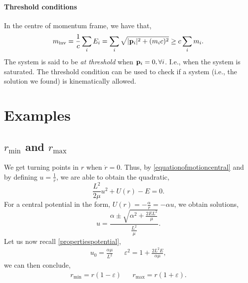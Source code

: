 \documentclass{book}
\begin{document}
\subsubsection{Threshold conditions}
In the centre of momentum frame, we have that,
\begin{equation}
	m_{\text{inv}} = \frac{1}{c}\sum_i E_i = \sum_i \sqrt{|\vb{p}_i|^2 + (m_ic)^2} \geq c\sum_im_i.
\end{equation}
The system is said to be \textit{at threshold} when $\vb{p}_i = 0, \forall i$. I.e., when the system is saturated. The threshold condition can be used to check if a system (i.e., the solution we found) is kinematically allowed.
\appendix
\chapter{Examples}
\section{$r_{\text{min}}$ and $r_{\text{max}}$}
We get turning points in $r$ when $\Dot{r} = 0$. Thus, by \eqref{equationofmotioncentral} and by defining $u = \frac{1}{r}$, we are able to obtain the quadratic,
\begin{equation}
    \frac{L^2}{2\mu}u^2 + U(r) - E = 0.
\end{equation}
For a central potential in the form, $U(r) = -\frac{\alpha}{r} = -\alpha u$, we obtain solutions,
\begin{equation}
    u = \frac{\alpha \pm \sqrt{\alpha^2 + \frac{2EL^2}{\mu}}}{\frac{L^2}{\mu}}.
\end{equation}
Let us now recall \eqref{propertiespotential}, 
\begin{align}
    u_0 = \frac{\alpha \mu}{L^2} && \varepsilon^2 = 1 + \frac{2L^2E}{\alpha \mu},
\end{align}
we can then conclude,
\begin{align}
    r_\text{min} = r(1-\varepsilon) && r_{\text{max}} = r(1+\varepsilon).
\end{align}
\end{document}
